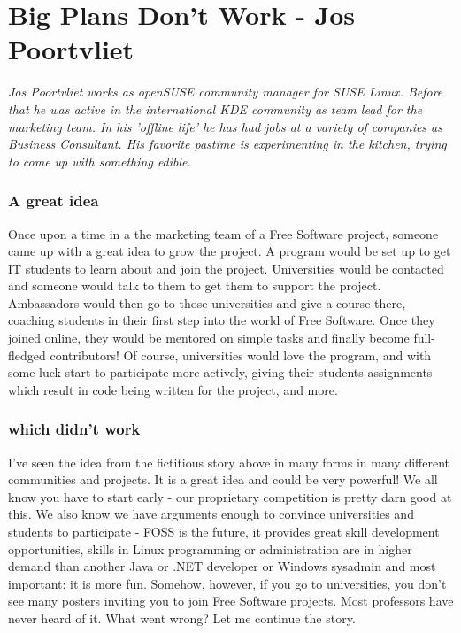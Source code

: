 \chapter{Big Plans Don't Work - Jos Poortvliet}

\textit{Jos Poortvliet works as openSUSE community manager for SUSE Linux. Before that he was active in the international KDE community as team lead for the marketing team. In his 'offline life' he has had jobs at a variety of companies as Business Consultant. His favorite pastime is experimenting in the kitchen, trying to come up with something edible.}

\subsection*{A great idea}
Once upon a time in a the marketing team of a Free Software project, someone came up with a great idea to grow the project. A program would be set up to get IT students to learn about and join the project. Universities would be contacted and someone would talk to them to get them to support the project. Ambassadors would then go to those universities and give a course there, coaching students in their first step into the world of Free Software. Once they joined online, they would be mentored on simple tasks and finally become full-fledged contributors! Of course, universities would love the program, and with some luck start to participate more actively, giving their students assignments which result in code being written for the project, and more.

\subsection*{which didn't work}
I've seen the idea from the fictitious story above in many forms in many different communities and projects. It is a great idea and could be very powerful! We all know you have to start early - our proprietary competition is pretty darn good at this. We also know we have arguments enough to convince universities and students to participate - FOSS is the future, it provides great skill development opportunities, skills in Linux programming or administration are in higher demand than another Java or .NET developer or Windows sysadmin and most important: it is more fun. Somehow, however, if you go to universities, you don't see many posters inviting you to join Free Software projects. Most professors have never heard of it. What went wrong? Let me continue the story.

